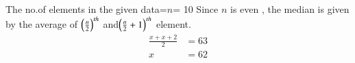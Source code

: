  The no.of elements in the given data=$n$= 10
 Since $n$ is even , the median is given by the average of $\left(\frac{n}{2}\right)^{th}$ and$\left(\frac{n}{2}+1\right)^{th}$ element.
\begin{align}
\frac{x+x+2}{2}&= 63\\
x&= 62
\end{align}

